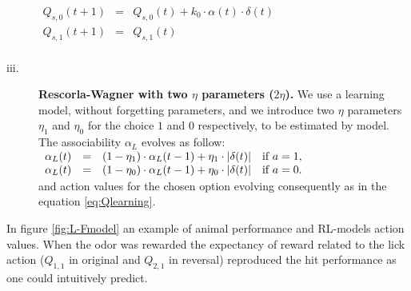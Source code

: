\begin{description}
    $\begin{array}{lcl}
       Q_{s,0}(t+1)&=&Q_{s,0}(t)+k_0\cdot\alpha(t)\cdot\delta(t)\\
         Q_{s,1}(t+1)&=&Q_{s,1}(t)\\ 
    \end{array}$
    \item[iii.] \textbf{Rescorla-Wagner with two $\eta$ parameters ($2\eta$).} We use a learning model, without forgetting parameters, and we introduce two $\eta$ parameters $\eta_1$ and $\eta_0$ for the choice $1$ and $0$ respectively, to be estimated by model. The associability $\alpha_L$ evolves as follow:\\
   $\begin{array}{lcll}
    \alpha_{L}(t) & = & (1-\eta_1)\cdot\alpha_{L}(t-1)+\eta_1\cdot\left\lvert\delta(t)\right\rvert & \mbox{if\,\,}  a=1,\\
    \alpha_{L}(t) & = & (1-\eta_0)\cdot\alpha_{L}(t-1)+\eta_0\cdot\left\lvert\delta(t)\right\rvert & \mbox{if\,\,}  a=0.\\
    \end{array}$\\
    and action values for the chosen option evolving consequently as in the equation \ref{eq:Qlearning}.
\end{description}
In figure \ref{fig:L-Fmodel} an example of animal performance and RL-models action values. When the odor was rewarded the expectancy of reward related to the lick action ($Q_{1,1}$ in original and $Q_{2,1}$ in reversal) reproduced the hit performance as one could intuitively predict. %
